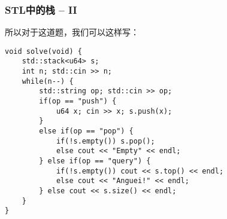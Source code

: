\documentclass{beamer}
\begin{document}
\begin{frame}[fragile]
\frametitle{STL中的栈 -- II}
所以对于这道题，我们可以这样写：\\
\begin{onlyenv}
\begin{verbatim}
void solve(void) {
    std::stack<u64> s;
    int n; std::cin >> n;
    while(n--) {
        std::string op; std::cin >> op;
        if(op == "push") {
            u64 x; cin >> x; s.push(x);
        }
        else if(op == "pop") {
            if(!s.empty()) s.pop();
            else cout << "Empty" << endl;
        } else if(op == "query") {
            if(!s.empty()) cout << s.top() << endl;
            else cout << "Anguei!" << endl;
        } else cout << s.size() << endl;
    }
}
\end{verbatim}
\end{onlyenv}
\end{frame}
\end{document}
